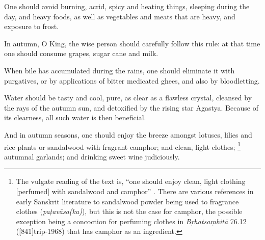 \begin{translation}
\item[20]
One should avoid burning, acrid, spicy and heating things, sleeping during the day, and heavy foods, as well as vegetables and meats that are heavy, and exposure to frost.


\item[21] %
In autumn, O King, the wise person should carefully follow this rule:
at that time one should consume grapes, sugar cane and milk. %

\item[22] %
When bile has accumulated during the rains, one should eliminate it with purgatives, or by applications of bitter medicated ghees, and also by bloodletting.

\item[23] %
Water should be tasty and cool, pure, as clear as a flawless crystal, cleansed by the rays of the autumn sun, and detoxified by the rising star Agastya. Because of its clearness, all such water is then beneficial.



\item[24] %
And in autumn seasons, one should enjoy the breeze amongst lotuses, lilies and rice plants or sandalwood with fragrant camphor; and clean, light clothes;%
    \footnote{The vulgate reading of the text is, ``one should enjoy clean, light clothing [perfumed] with sandalwood and camphor'' \citep[809]{vulgate}. There are various references in early Sanskrit literature to sandalwood powder being used to fragrance clothes (\emph{paṭavāsa(ka)}), but this is not the case for camphor, the possible exception being a concoction for perfuming clothes in \emph{Bṛhatsaṃhitā} 76.12 ([841]{trip-1968}) that has camphor as an ingredient.} %
autumnal garlands; and drinking sweet wine judiciously.
%
%


\end{translation}
